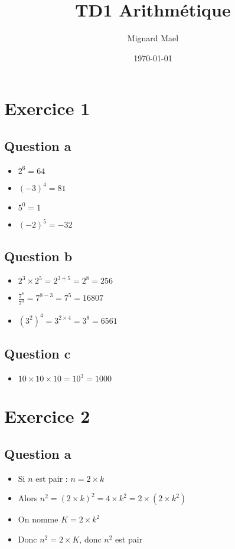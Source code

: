 \documentclass[a4paper,12pt]{article}
\title{TD1 Arithmétique}
\author{Mignard Mael}
\date{\today}
\begin{document}
\maketitle
\thispagestyle{empty}

\section{Exercice 1}
\subsection{Question a}
\begin{itemize}
    \item $2^6 = 64$
    \item $(-3)^4 = 81$
    \item $5^0 = 1$
    \item $(-2)^5 = -32$
\end{itemize}

\subsection{Question b}
\begin{itemize}
    \item $2^3 \times 2^5 = 2^{3+5} = 2^8 = 256$
    \item $\frac{7^8}{7^3} = 7^{8-3} = 7^5 = 16807$
    \item $(3^2)^4 = 3^{2 \times 4} = 3^8 = 6561$
\end{itemize}

\subsection{Question c}
\begin{itemize}
    \item $10 \times 10 \times 10 = 10^3 = 1000$
\end{itemize}

\clearpage
\section{Exercice 2}
\subsection{Question a}
\begin{itemize}
    \item Si $n$ est pair : $n = 2 \times k$
    \item Alors $n^2 = (2 \times k)^2 = 4 \times k^2 = 2 \times (2 \times k^2)$
    \item On nomme $K = 2 \times k^2$
    \item Donc $n^2 = 2 \times K$, donc $n^2$ est pair
\end{itemize}
\end{document}
